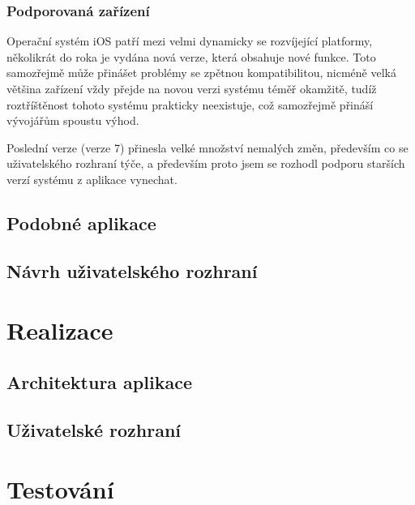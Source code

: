 \documentclass[thesis=B,czech]{FITthesis}[2012/06/26]
\begin{document}
\subsection{Podporovaná zařízení}

	Operační systém iOS patří mezi velmi dynamicky se rozvíjející platformy, několikrát do roka je vydána nová verze, která obsahuje nové funkce. Toto samozřejmě může přinášet problémy se zpětnou kompatibilitou, nicméně velká většina zařízení vždy přejde na novou verzi systému téměř okamžitě, tudíž roztříštěnost tohoto systému prakticky neexistuje, což samozřejmě přináší vývojářům spoustu výhod.

	Poslední verze (verze 7) přinesla velké množství nemalých změn, především co se uživatelského rozhraní týče, a především proto jsem se rozhodl podporu starších verzí systému z aplikace vynechat.

\section{Podobné aplikace}\label{sec:competition}

\section{Návrh uživatelského rozhraní}

\chapter{Realizace}

\section{Architektura aplikace}

\section{Uživatelské rozhraní}

\chapter{Testování}

\begin{conclusion}
\end{conclusion}




\appendix
\end{document}
